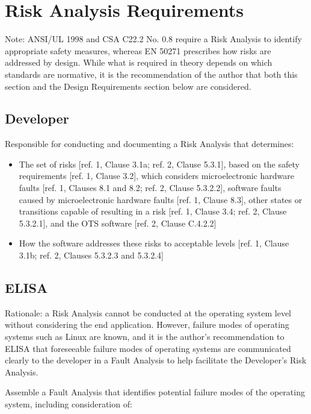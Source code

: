 \documentclass[12pt]{../Common_files/ElisaPaper}
\begin{document}
\section{Risk Analysis Requirements}
Note: ANSI/UL 1998 and CSA C22.2 No. 0.8 require a Risk Analysis to identify appropriate safety measures, whereas EN 50271 prescribes how risks are addressed by design.  
While what is required in theory depends on which standards are normative, it is the recommendation of the author that both this section and the Design Requirements section below are considered.

\subsection{Developer}
Responsible for conducting and documenting a Risk Analysis that determines:

\begin{itemize}

\item The set of risks [ref. 1, Clause 3.1a; ref. 2, Clause 5.3.1], based on the safety requirements [ref. 1, Clause 3.2], which considers microelectronic hardware faults [ref. 1, Clauses 8.1 and 8.2; ref. 2, Clause 5.3.2.2], software faults caused by microelectronic hardware faults [ref. 1, Clause 8.3], other states or transitions capable of resulting in a risk [ref. 1, Clause 3.4; ref. 2, Clause 5.3.2.1], and the OTS software [ref. 2, Clause C.4.2.2]

\item How the software addresses these risks to acceptable levels [ref. 1, Clause 3.1b; ref. 2, Clauses 5.3.2.3 and 5.3.2.4]

\end{itemize}

\subsection{ELISA}
Rationale: a Risk Analysis cannot be conducted at the operating system level without considering the end application.  
However, failure modes of operating systems such as Linux are known, and it is the author's recommendation to ELISA that foreseeable failure modes of operating systems are communicated clearly to the developer in a Fault Analysis to help facilitate the Developer's Risk Analysis.

Assemble a Fault Analysis that identifies potential failure modes of the operating system, including consideration of:
\end{document}
